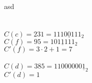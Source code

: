 \documentclass{article}
\begin{document}
asd\\
\\
\\
$C(c) = 231 = 1110\underline{0}111_2$\\
$C(f) = 95 = 101\underline{1}111_2$\\
$C'(f) = 3\cdot{}2 + 1 = 7$\\
\\
$C(d) = 385 = 11000000\underline{1}_2$\\
$C'(d) = 1$
\end{document}
